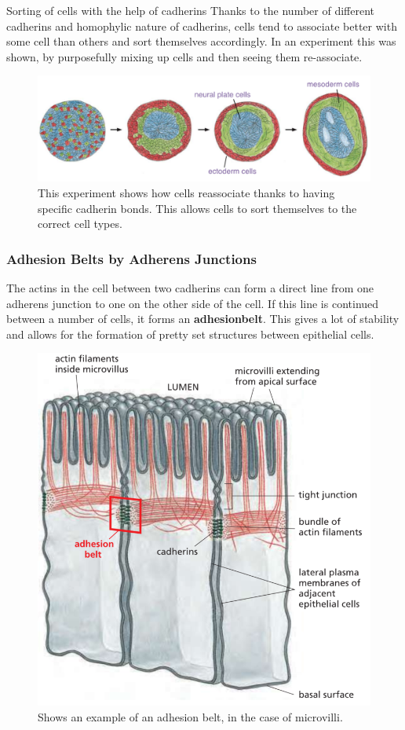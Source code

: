 \documentclass[../main.tex]{subfiles}
\begin{document}
\begin{RemarkWithTitel}{Sorting of cells with the help of cadherins}
	Thanks to the number of different cadherins and homophylic nature of cadherins, cells tend to associate better with some cell than others and sort themselves accordingly. In an experiment this was shown, by purposefully mixing up cells and then seeing them re-associate.
	
	\begin{figure}[H]
		\centering
		\includegraphics[width=0.5\linewidth]{cad_reas}
		\caption{This experiment shows how cells reassociate thanks to having specific cadherin bonds. This allows cells to sort themselves to the correct cell types.}
		\label{fig:cadreas}
	\end{figure}
	
\end{RemarkWithTitel}

\subsubsection{Adhesion Belts by Adherens Junctions}

The actins in the cell between two cadherins can form a direct line from one adherens junction to one on the other side of the cell. If this line is continued between a number of cells, it forms an \textbf{\gls{adhesionbelt}}. This gives a lot of stability and allows for the formation of pretty set structures between epithelial cells. 

\begin{figure}[H]
	\centering
	\includegraphics[width=0.4\linewidth]{cad_micr}
	\caption{Shows an example of an adhesion belt, in the case of \gls{microvilli}.}
	\label{fig:cadmicr}
\end{figure}
\end{document}
